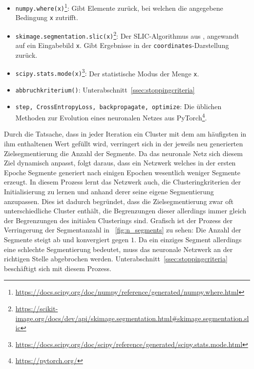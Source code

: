 \begin{itemize}
	\item{\lstinline[columns=fixed]{numpy.where(x)}\footnote{\url{https://docs.scipy.org/doc/numpy/reference/generated/numpy.where.html}}:} Gibt Elemente zurück, bei welchen die angegebene Bedingung \lstinline[columns=fixed]{x} zutrifft.
	\item{\lstinline[columns=fixed]{skimage.segmentation.slic(x)}\footnote{\url{https://scikit-image.org/docs/dev/api/skimage.segmentation.html\#skimage.segmentation.slic}}:} Der SLIC-Algorithmus aus \cite{achanta_10}, angewandt auf ein Eingabebild \lstinline[columns=fixed]{x}. Gibt Ergebnisse in der \lstinline[columns=fixed]{coordinates}-Darstellung zurück.
	\item{\lstinline[columns=fixed]{scipy.stats.mode(x)}\footnote{\url{https://docs.scipy.org/doc/scipy/reference/generated/scipy.stats.mode.html}}:} Der statistische Modus der Menge \lstinline[columns=fixed]{x}.
	\item{\lstinline[columns=fixed]{abbruchkriterium()}:} \Vgl Unterabschnitt~\ref{ssec:stoppingcriteria}
	\item{\lstinline[columns=fixed]{step, CrossEntropyLoss, backpropagate, optimize}:} Die üblichen Methoden zur Evolution eines neuronalen Netzes aus PyTorch\footnote{\url{https://pytorch.org/}}.
\end{itemize}

Durch die Tatsache, dass in jeder Iteration ein Cluster mit dem am häufigsten in ihm enthaltenen Wert gefüllt wird, verringert sich in der jeweils neu generierten Zielsegmentierung die Anzahl der Segmente. Da das neuronale Netz sich diesem Ziel dynamisch anpasst, folgt daraus, dass ein Netzwerk welches in der ersten Epoche  Segmente generiert nach einigen Epochen wesentlich weniger Segmente erzeugt. In diesem Prozess lernt das Netzwerk auch, die Clusteringkriterien der Initialisierung zu lernen und anhand derer seine eigene Segmentierung anzupassen. Dies ist dadurch begründet, dass die Zielsegmentierung zwar oft unterschiedliche Cluster enthält, die Begrenzungen dieser allerdings immer gleich der Begrenzungen des initialen Clusterings sind.
Grafisch ist der Prozess der Verringerung der Segmentanzahl in \figurename~\ref{fig:n_segments} zu sehen: Die Anzahl der Segmente steigt ab und konvergiert gegen $1$. Da ein einziges Segment allerdings eine schlechte Segmentierung bedeutet, muss das neuronale Netzwerk an der richtigen Stelle abgebrochen werden. Unterabschnitt~\ref{ssec:stoppingcriteria} beschäftigt sich mit diesem Prozess.

